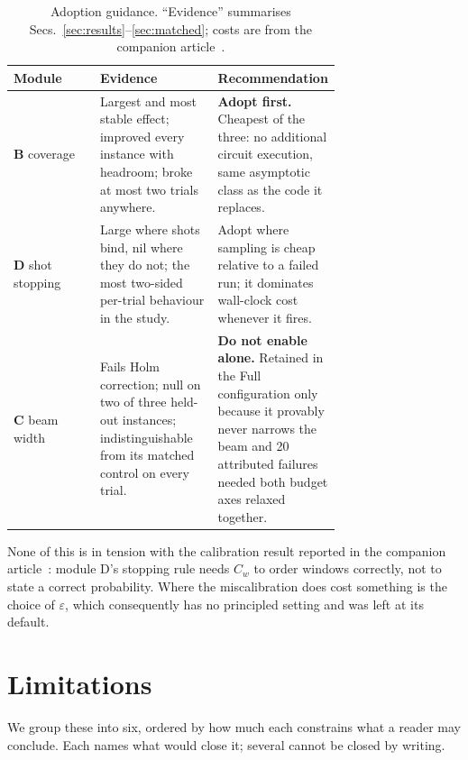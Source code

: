 \documentclass[preprint,11pt]{elsarticle}
\newcommand{\Cw}{C_w}
\begin{document}
\begin{table}[htbp]
\centering\small
\caption{Adoption guidance. ``Evidence'' summarises
Secs.~\ref{sec:results}--\ref{sec:matched}; costs are from the companion
article~\cite{methodpaper}.}
\label{tab:adopt}
\begin{tabular}{@{}lp{0.36\linewidth}p{0.36\linewidth}@{}}
\toprule
Module & Evidence & Recommendation \\
\midrule
\textbf{B} coverage
 & Largest and most stable effect; improved every instance with
   headroom; broke at most two trials anywhere.
 & \textbf{Adopt first.} Cheapest of the three: no additional circuit
   execution, same asymptotic class as the code it replaces. \\[3pt]
\textbf{D} shot stopping
 & Large where shots bind, nil where they do not; the most two-sided
   per-trial behaviour in the study.
 & Adopt where sampling is cheap relative to a failed run; it dominates
   wall-clock cost whenever it fires. \\[3pt]
\textbf{C} beam width
 & Fails Holm correction; null on two of three held-out instances;
   indistinguishable from its matched control on every trial.
 & \textbf{Do not enable alone.} Retained in the Full configuration only
   because it provably never narrows the beam and 20 attributed failures
   needed both budget axes relaxed together. \\
\bottomrule
\end{tabular}
\end{table}

None of this is in tension with the calibration result reported in the
companion article~\cite{methodpaper}: module D's stopping rule needs
$\Cw$ to order windows correctly, not to state a correct probability. Where the
miscalibration does cost something is the choice of $\varepsilon$, which
consequently has no principled setting and was left at its default.


\section{Limitations}
\label{sec:limitations}

We group these into six, ordered by how much each constrains what a
reader may conclude. Each names what would close it; several cannot be
closed by writing.
\end{document}

